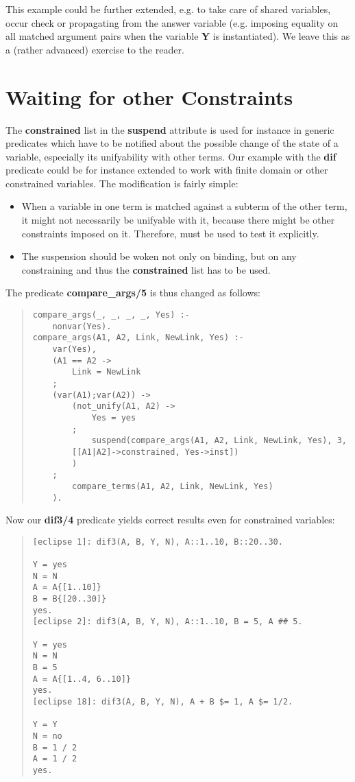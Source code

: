 This example could be further extended, e.g. to take care of shared
variables, occur check or propagating from the answer variable
(e.g. imposing equality on all matched argument pairs when the
variable {\bf Y} is instantiated).
We leave this as a (rather advanced) exercise to the reader.

\section{Waiting for other Constraints}
The {\bf constrained} list in the {\bf suspend} attribute
is used for instance in generic predicates which have to be
notified about the possible change of the state of a variable,
especially its unifyability with other terms.
Our example with the {\bf dif} predicate could be for instance
extended to work with finite domain or other constrained
variables.
The modification is fairly simple:
\begin{itemize}
\item When a variable in one term is matched against a subterm of the
other term, it might not necessarily be unifyable with it, because
there might be other constraints imposed on it.
Therefore,  must be used to test it explicitly.

\item The suspension should be woken not only on binding, but
on any constraining and thus the {\bf constrained} list
has to be used.
\end{itemize}

The predicate {\bf compare_args/5} is thus changed as follows:
\begin{quote}
\begin{verbatim}
compare_args(_, _, _, _, Yes) :-
    nonvar(Yes).
compare_args(A1, A2, Link, NewLink, Yes) :-
    var(Yes),
    (A1 == A2 ->
        Link = NewLink
    ;
    (var(A1);var(A2)) ->
        (not_unify(A1, A2) ->
            Yes = yes
        ;
            suspend(compare_args(A1, A2, Link, NewLink, Yes), 3,
		[[A1|A2]->constrained, Yes->inst])
        )
    ;
        compare_terms(A1, A2, Link, NewLink, Yes)
    ).
\end{verbatim}
\end{quote}

Now our {\bf dif3/4} predicate yields correct results even for
constrained variables:
\begin{quote}
\begin{verbatim}
[eclipse 1]: dif3(A, B, Y, N), A::1..10, B::20..30.

Y = yes
N = N
A = A{[1..10]}
B = B{[20..30]}
yes.
[eclipse 2]: dif3(A, B, Y, N), A::1..10, B = 5, A ## 5.
 
Y = yes
N = N
B = 5
A = A{[1..4, 6..10]}
yes.
[eclipse 18]: dif3(A, B, Y, N), A + B $= 1, A $= 1/2.

Y = Y
N = no
B = 1 / 2
A = 1 / 2
yes.

\end{verbatim}
\end{quote}

